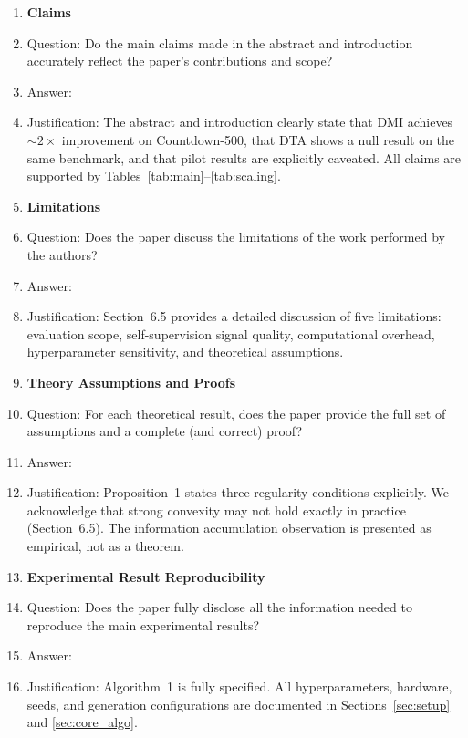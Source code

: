 \documentclass{article}
\begin{document}
\begin{enumerate}

\item {\bf Claims}
    \item[] Question: Do the main claims made in the abstract and introduction accurately reflect the paper's contributions and scope?
    \item[] Answer: \answerYes{}
    \item[] Justification: The abstract and introduction clearly state that DMI achieves ${\sim}2{\times}$ improvement on Countdown-500, that DTA shows a null result on the same benchmark, and that pilot results are explicitly caveated. All claims are supported by Tables~\ref{tab:main}--\ref{tab:scaling}.

\item {\bf Limitations}
    \item[] Question: Does the paper discuss the limitations of the work performed by the authors?
    \item[] Answer: \answerYes{}
    \item[] Justification: Section~6.5 provides a detailed discussion of five limitations: evaluation scope, self-supervision signal quality, computational overhead, hyperparameter sensitivity, and theoretical assumptions.

\item {\bf Theory Assumptions and Proofs}
    \item[] Question: For each theoretical result, does the paper provide the full set of assumptions and a complete (and correct) proof?
    \item[] Answer: \answerYes{}
    \item[] Justification: Proposition~1 states three regularity conditions explicitly. We acknowledge that strong convexity may not hold exactly in practice (Section~6.5). The information accumulation observation is presented as empirical, not as a theorem.

\item {\bf Experimental Result Reproducibility}
    \item[] Question: Does the paper fully disclose all the information needed to reproduce the main experimental results?
    \item[] Answer: \answerYes{}
    \item[] Justification: Algorithm~1 is fully specified. All hyperparameters, hardware, seeds, and generation configurations are documented in Sections~\ref{sec:setup} and \ref{sec:core_algo}.


\end{enumerate}
\end{document}

